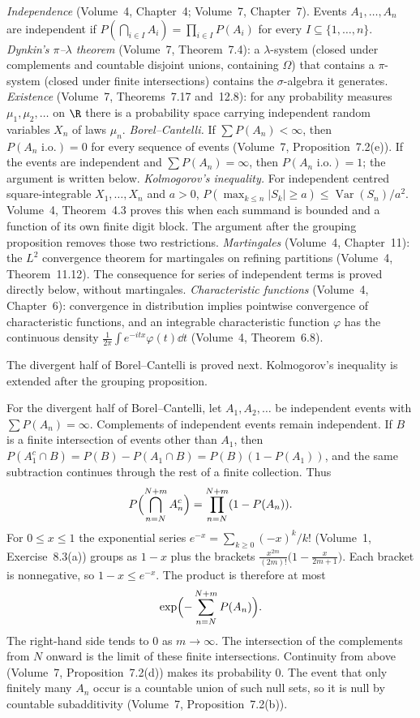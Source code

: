 \begin{reminder}
\emph{Independence} (Volume~4, Chapter~4; Volume~7, Chapter~7). Events $A_1,\dots,A_n$ are independent if
$P(\bigcap_{i\in I}A_i)=\prod_{i\in I}P(A_i)$ for every $I\subseteq\{1,\dots,n\}$. \emph{Dynkin's $\pi$--$\lambda$
theorem} (Volume~7, Theorem~7.4): a $\lambda$-system (closed under complements and countable disjoint unions, containing
$\Omega$) that contains a $\pi$-system (closed under finite intersections) contains the $\sigma$-algebra it generates.
\emph{Existence} (Volume~7, Theorems~7.17 and~12.8): for any probability measures $\mu_1,\mu_2,\dots$ on $\R$ there is a
probability space carrying independent random variables $X_n$ of laws $\mu_n$. \emph{Borel--Cantelli.} If $\sum P(A_n)<\infty$, then $P(A_n\text{ i.o.})=0$ for every sequence of events (Volume~7, Proposition~7.2(e)). If the events are independent and $\sum P(A_n)=\infty$, then $P(A_n\text{ i.o.})=1$; the argument is written below. \emph{Kolmogorov's inequality.} For independent centred square-integrable $X_1,\dots,X_n$ and $a>0$,
$P(\max_{k\le n}|S_k|\ge a)\le\operatorname{Var}(S_n)/a^2$. Volume~4, Theorem~4.3 proves this when each summand is bounded and a function of its own finite digit block. The argument after the grouping proposition removes those two restrictions. \emph{Martingales} (Volume~4, Chapter~11): the $L^2$ convergence theorem for martingales on refining
partitions (Volume~4, Theorem~11.12). The consequence for series of independent terms is proved directly below, without martingales.
\emph{Characteristic functions} (Volume~4, Chapter~6): convergence in distribution implies pointwise convergence of
characteristic functions, and an integrable characteristic function $\varphi$ has the continuous density
$\frac1{2\pi}\int e^{-itx}\varphi(t)\dd t$ (Volume~4, Theorem~6.8).
\end{reminder}

The divergent half of Borel--Cantelli is proved next. Kolmogorov's inequality is extended after the grouping proposition.

For the divergent half of Borel--Cantelli, let $A_1,A_2,\dots$ be independent events with $\sum P(A_n)=\infty$. Complements of independent events remain independent. If $B$ is a finite intersection of events other than $A_1$, then $P(A_1^c\cap B)=P(B)-P(A_1\cap B)=P(B)(1-P(A_1))$, and the same subtraction continues through the rest of a finite collection. Thus
\[
P\Bigl(\bigcap_{n=N}^{N+m}A_n^c\Bigr)=\prod_{n=N}^{N+m}(1-P(A_n)).
\]
For $0\le x\le1$ the exponential series $e^{-x}=\sum_{k\ge0}(-x)^k/k!$ (Volume~1, Exercise~8.3(a)) groups as $1-x$ plus the brackets $\frac{x^{2m}}{(2m)!}\bigl(1-\frac x{2m+1}\bigr)$. Each bracket is nonnegative, so $1-x\le e^{-x}$. The product is therefore at most
\[
\exp\Bigl(-\sum_{n=N}^{N+m}P(A_n)\Bigr).
\]
The right-hand side tends to $0$ as $m\to\infty$. The intersection of the complements from $N$ onward is the limit of these finite intersections. Continuity from above (Volume~7, Proposition~7.2(d)) makes its probability $0$. The event that only finitely many $A_n$ occur is a countable union of such null sets, so it is null by countable subadditivity (Volume~7, Proposition~7.2(b)).

